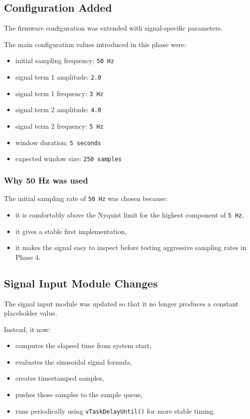 \documentclass[12pt,a4paper]{article}
\begin{document}
\subsection{Configuration Added}

The firmware configuration was extended with signal-specific parameters.

The main configuration values introduced in this phase were:

\begin{itemize}
    \item initial sampling frequency: \texttt{50 Hz}
    \item signal term 1 amplitude: \texttt{2.0}
    \item signal term 1 frequency: \texttt{3 Hz}
    \item signal term 2 amplitude: \texttt{4.0}
    \item signal term 2 frequency: \texttt{5 Hz}
    \item window duration: \texttt{5 seconds}
    \item expected window size: \texttt{250 samples}
\end{itemize}

\subsubsection*{Why 50 Hz was used}

The initial sampling rate of \texttt{50 Hz} was chosen because:

\begin{itemize}
    \item it is comfortably above the Nyquist limit for the highest component
    of \texttt{5 Hz},
    \item it gives a stable first implementation,
    \item it makes the signal easy to inspect before testing aggressive
    sampling rates in Phase 4.
\end{itemize}

\subsection{Signal Input Module Changes}

The signal input module was updated so that it no longer produces a constant
placeholder value.

Instead, it now:

\begin{itemize}
    \item computes the elapsed time from system start,
    \item evaluates the sinusoidal signal formula,
    \item creates timestamped samples,
    \item pushes those samples to the sample queue,
    \item runs periodically using \texttt{vTaskDelayUntil()} for more stable
    timing.
\end{itemize}
\end{document}
